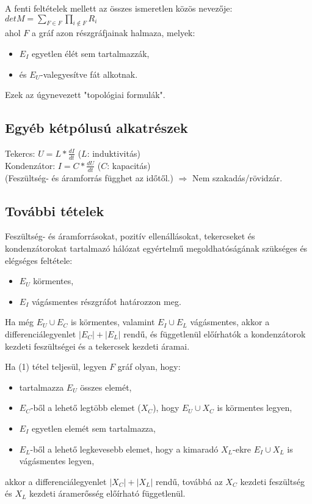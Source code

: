 \begin{theo}
A fenti feltételek mellett az összes ismeretlen közös nevezője: 
$detM=\sum\limits_{F\in F}\prod\limits_{i\notin F} R_{i}$\\
ahol $F$ a gráf azon részgráfjainak halmaza, melyek:
\begin{itemize}
\item $E_{I}$ egyetlen élét sem tartalmazzák,
\item és $E_{U}$-valegyesítve fát alkotnak.
\end{itemize}
Ezek az úgynevezett "topológiai formulák".
\end{theo}

\subsection*{Egyéb kétpólusú alkatrészek}
Tekercs: $U=L*\frac{dI}{dt}$ ($L$: induktivitás)\\
Kondenzátor: $I=C*\frac{dU}{dt}$ ($C$: kapacitás)\\
(Feszültség- és áramforrás függhet az időtől.) $\Rightarrow$ Nem szakadás/rövidzár.

\subsection*{További tételek}
\begin{theo} [1]
Feszültség- és áramforrásokat, pozitív ellenállásokat, tekercseket és kondenzátorokat tartalmazó hálózat egyértelmű megoldhatóságának szükséges és elégséges feltétele:
\begin{itemize}
\item $E_{U}$ körmentes,
\item $E_{I}$ vágásmentes részgráfot határozzon meg.
\end{itemize}
\end{theo}

\begin{theo} [2]
Ha még $E_{U}\cup E_{C}$ is körmentes, valamint $E_{I}\cup E_{L}$ vágásmentes, akkor a differenciálegyenlet $|E_{C}|+|E_{L}|$ rendű, és függetlenül előírhatók a kondenzátorok kezdeti feszültségei és a tekercsek kezdeti áramai.
\end{theo}

\noindent
Ha (1) tétel teljesül, legyen $F$ gráf olyan, hogy:
\begin{itemize}
\item tartalmazza $E_{U}$ összes elemét,
\item $E_{C}$-ből a lehető legtöbb elemet ($X_{C}$), hogy $E_{U}\cup X_{C}$ is körmentes legyen,
\item $E_{I}$ egyetlen elemét sem tartalmazza,
\item $E_{L}$-ből a lehető legkevesebb elemet, hogy a kimaradó $X_{L}$-ekre $E_{I}\cup X_{L}$ is vágásmentes legyen,
\end{itemize}
akkor a differenciálegyenlet $|X_{C}|+|X_{L}|$ rendű, továbbá az $X_{C}$ kezdeti feszültség és $X_{L}$ kezdeti áramerősség előírható függetlenül.



